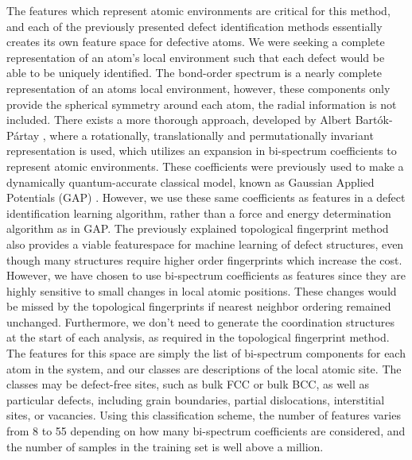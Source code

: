 \documentclass[12pt]{iopart}
\begin{document}
The features which represent atomic environments are critical for this method, and each of the previously presented defect identification methods essentially creates its own feature space for defective atoms. We were seeking a complete representation of an atom's local environment such that each defect would be able to be uniquely identified. The bond-order spectrum is a nearly complete representation of an atoms local environment, however, these components only provide the spherical symmetry around each atom, the radial information is not included. There exists a more thorough approach, developed by Albert Bartók-Pártay \cite{Bartok-Partay}, where a rotationally, translationally and permutationally invariant representation is used, which utilizes an expansion in bi-spectrum coefficients to represent atomic environments. These coefficients were previously used to make a dynamically quantum-accurate classical model, known as Gaussian Applied Potentials (GAP) \cite{Bartok2010a}. However, we use these same coefficients as features in a defect identification learning algorithm, rather than a force and energy determination algorithm as in GAP. The previously explained topological fingerprint method also provides a viable featurespace for machine learning of defect structures, even though many structures require higher order fingerprints which increase the cost. However, we have chosen to use bi-spectrum coefficients as features since they are highly sensitive to small changes in local atomic positions. These changes would be missed by the topological fingerprints if nearest neighbor ordering remained unchanged. Furthermore, we don't need to generate the coordination structures at the start of each analysis, as required in the topological fingerprint method. The features for this space are simply the list of bi-spectrum components for each atom in the system, and our classes are descriptions of the local atomic site. The classes may be defect-free sites, such as bulk FCC or bulk BCC, as well as particular defects, including grain boundaries, partial dislocations, interstitial sites, or vacancies. Using this classification scheme, the number of features varies from 8 to 55 depending on how many bi-spectrum coefficients are considered, and the number of samples in the training set is well above a million. 
\end{document}

